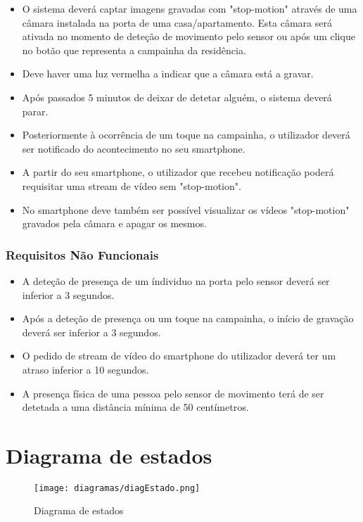 \documentclass{article}
\begin{document}
\begin{itemize}
    \item O sistema deverá captar imagens gravadas com "stop-motion" através de uma câmara instalada na porta de uma casa/apartamento. Esta câmara será ativada no momento de deteção de movimento pelo sensor ou após um clique no botão que representa a campainha da residência.
    \item Deve haver uma luz vermelha a indicar que a câmara está a gravar.
    \item Após passados 5 minutos de deixar de detetar alguém, o sistema deverá parar.
    \item Posteriormente à ocorrência de um toque na campainha, o utilizador deverá ser notificado do acontecimento no seu smartphone.
    \item A partir do seu smartphone, o utilizador que recebeu notificação poderá requisitar uma stream de vídeo sem "stop-motion".
    \item No smartphone deve também ser possível visualizar os vídeos "stop-motion" gravados pela câmara e apagar os mesmos.
\end{itemize}
\vspace{2mm}

\subsubsection{Requisitos Não Funcionais}
\vspace{2mm}

\begin{itemize}
    \item A deteção de presença de um índividuo na porta pelo sensor deverá ser inferior a 3 segundos.
    \item Após a deteção de presença ou um toque na campainha, o início de gravação deverá ser inferior a 3 segundos.
    \item O pedido de stream de vídeo do smartphone do utilizador deverá ter um atraso inferior a 10 segundos.
    \item A presença física de uma pessoa pelo sensor de movimento terá de ser detetada a uma distância mínima de 50 centímetros.
\end{itemize}

\newpage
\section{Diagrama de estados}

    \begin{figure}[h!]
    \centering
    \texttt{[image: diagramas/diagEstado.png]}
    \caption{Diagrama de estados}
    \label{fig:diagEstados}
\end{figure}
\end{document}
